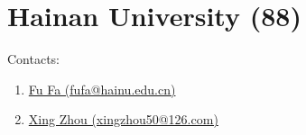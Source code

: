 \section{Hainan University (88)}
\label{sec:HU}

Contacts:
\begin{enumerate}
 \item {}\href{mailto:fufa@hainu.edu.cn}{Fu Fa (fufa@hainu.edu.cn)}
 \item {}\href{mailto:xingzhou50@126.com}{Xing Zhou (xingzhou50@126.com)}
\end{enumerate}

